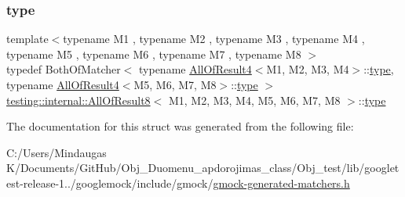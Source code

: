 \subsubsection{\texorpdfstring{type}{type}}
{\footnotesize\ttfamily template$<$typename M1 , typename M2 , typename M3 , typename M4 , typename M5 , typename M6 , typename M7 , typename M8 $>$ \\
typedef Both\+Of\+Matcher$<$ typename \mbox{\hyperlink{structtesting_1_1internal_1_1_all_of_result4}{All\+Of\+Result4}}$<$M1, M2, M3, M4$>$\+::\mbox{\hyperlink{structtesting_1_1internal_1_1_all_of_result8_a7103892a28c35221b9e62e871c577727}{type}}, typename \mbox{\hyperlink{structtesting_1_1internal_1_1_all_of_result4}{All\+Of\+Result4}}$<$M5, M6, M7, M8$>$\+::\mbox{\hyperlink{structtesting_1_1internal_1_1_all_of_result8_a7103892a28c35221b9e62e871c577727}{type}} $>$ \mbox{\hyperlink{structtesting_1_1internal_1_1_all_of_result8}{testing\+::internal\+::\+All\+Of\+Result8}}$<$ M1, M2, M3, M4, M5, M6, M7, M8 $>$\+::\mbox{\hyperlink{structtesting_1_1internal_1_1_all_of_result8_a7103892a28c35221b9e62e871c577727}{type}}}



The documentation for this struct was generated from the following file\+:\begin{DoxyCompactItemize}
\item 
C\+:/\+Users/\+Mindaugas K/\+Documents/\+Git\+Hub/\+Obj\+\_\+\+Duomenu\+\_\+apdorojimas\+\_\+class/\+Obj\+\_\+test/lib/googletest-\/release-\/1../googlemock/include/gmock/\mbox{\hyperlink{_obj__test_2lib_2googletest-release-1_88_81_2googlemock_2include_2gmock_2gmock-generated-matchers_8h}{gmock-\/generated-\/matchers.\+h}}\end{DoxyCompactItemize}
